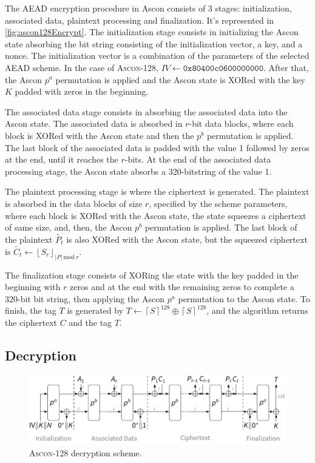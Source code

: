 \documentclass[11pt,twoside]{article}
\begin{document}
The AEAD encryption procedure in Ascon consists of 3 stages: initialization, associated data, plaintext processing and finalization. It's represented in \cref{fig:ascon128Encrypt}. The initialization stage consists in initializing the Ascon state absorbing the bit string consisting of the initialization vector, a key, and a nonce. The initialization vector is a combination of the parameters of the selected AEAD scheme. In the case of \textsc{Ascon-128}, $IV \leftarrow \texttt{0x80400c0600000000} $. After that, the Ascon $p^a$  permutation is applied and the Ascon state is XORed with the key $K$ padded with zeros in the beginning.

The associated data stage consists in absorbing the associated data into the Ascon state. The associated data is absorbed in $r$-bit data blocks, where each block is XORed with the Ascon state and then the $p^b$ permutation is applied. The last block of the associated data is padded with the value 1 followed by zeros at the end, until it reaches the $r$-bits. At the end of the associated data processing stage, the Ascon state absorbs a 320-bitstring of the value 1.

The plaintext processing stage is where the ciphertext is generated. The plaintext is absorbed in the data blocks of size $r$, specified by the scheme parameters, where each block is XORed with the Ascon state, the state squeezes a ciphertext of same size, and, then, the Ascon $p^b$ permutation is applied. The last block of the plaintext $\tilde{P_t}$ is also XORed with the Ascon
state, but the squeezed ciphertext is $\tilde{C_t} \leftarrow {\left \lfloor  S_r \right \rfloor}_{|P| \ \textrm{mod} \ r}$.

The finalization stage consists of XORing the state with the key padded in the beginning with $r$ zeros and at the end with the remaining zeros to complete a 320-bit bit string, then applying the Ascon $p^a$ permutation to the Ascon state. To finish, the tag $T$ is generated by $T \leftarrow {\left \lceil  S \right \rceil}^{128} \oplus  {\left \lceil  S \right \rceil}^{128}$, and the algorithm returns the ciphertext $C$ and the tag $T$.

\subsection{Decryption}

\begin{figure}[h]
  \centering
  \includegraphics[scale=0.8]{assets/aead_decrypt.pdf}
  \caption{\textsc{Ascon-128} decryption scheme.}
  \label{fig:ascon128decrypt}
\end{figure}
\end{document}
